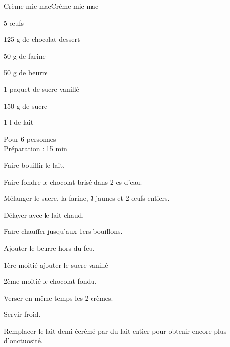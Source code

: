 \begin{recette}{Crème mic-mac}{Crème mic-mac}

\begin{ingredients}
5 œufs\par
125 g de chocolat dessert\par
50 g de farine\par
50 g de beurre\par
1 paquet de sucre vanillé\par
150 g de sucre\par
1 l de lait\par
\end{ingredients}

\begin{infos}
Pour 6 personnes\\
Préparation : 15 min\\
\end{infos}

\begin{etapes}
\item Faire bouillir le lait.
\item Faire fondre le chocolat brisé dans 2 cs d’eau.
\item Mélanger le sucre, la farine, 3 jaunes et 2 œufs entiers.
\item Délayer avec le lait chaud.
\item Faire chauffer jusqu’aux 1ers bouillons.
\item Ajouter le beurre hors du feu.
\item 1ère moitié ajouter le sucre vanillé
\item 2ème moitié le chocolat fondu.
\item Verser en même temps les 2 crèmes.
\item Servir froid.
\end{etapes}

\begin{conseils}
Remplacer le lait demi-écrémé par du lait entier pour obtenir encore plus d'onctuosité.
\end{conseils}

\end{recette}